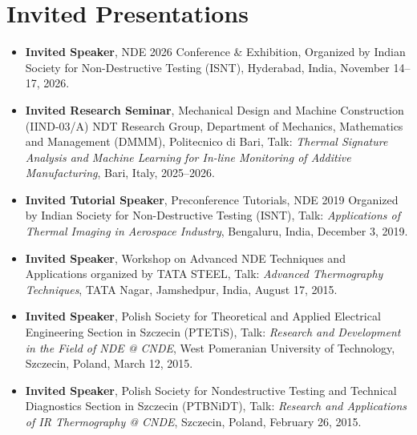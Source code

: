 \documentclass{my_cv}%
\begin{document}
\section{Invited Presentations}
\vspace{0.3em}
\begin{itemize}[leftmargin=0.15in]
\setlength\itemsep{-0.15em}
\color{mygray}
\item \textbf{Invited Speaker}, NDE 2026 Conference \& Exhibition, Organized by Indian Society for Non-Destructive Testing (ISNT), Hyderabad, India, November 14--17, 2026.
\item \textbf{Invited Research Seminar}, Mechanical Design and Machine Construction (IIND-03/A) NDT Research Group, Department of Mechanics, Mathematics and Management (DMMM), Politecnico di Bari, Talk: \textit{Thermal Signature Analysis and Machine Learning for In-line Monitoring of Additive Manufacturing}, Bari, Italy, 2025--2026.
\item \textbf{Invited Tutorial Speaker}, Preconference Tutorials, NDE 2019 Organized by Indian Society for Non-Destructive Testing (ISNT), Talk: \textit{Applications of Thermal Imaging in Aerospace Industry}, Bengaluru, India, December 3, 2019.
\item \textbf{Invited Speaker}, Workshop on Advanced NDE Techniques and Applications organized by TATA STEEL, Talk: \textit{Advanced Thermography Techniques}, TATA Nagar, Jamshedpur, India, August 17, 2015.
\item \textbf{Invited Speaker}, Polish Society for Theoretical and Applied Electrical Engineering Section in Szczecin (PTETiS), Talk: \textit{Research and Development in the Field of NDE @ CNDE}, West Pomeranian University of Technology, Szczecin, Poland, March 12, 2015.
\item \textbf{Invited Speaker}, Polish Society for Nondestructive Testing and Technical Diagnostics Section in Szczecin (PTBNiDT), Talk: \textit{Research and Applications of IR Thermography @ CNDE}, Szczecin, Poland, February 26, 2015.
\end{itemize}
\end{document}
